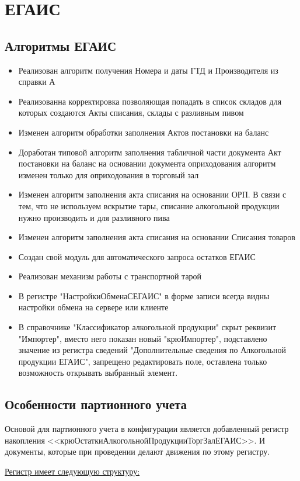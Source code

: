 \section{ЕГАИС}
\subsection{Алгоритмы ЕГАИС}


\begin{itemize}
	\item Реализован алгоритм получения Номера и даты ГТД и Производителя из справки А
	\item Реализованна корректировка позволяющая попадать в список складов для которых создаются Акты списания, склады с разливным пивом
	\item Изменен алгоритм обработки заполнения Актов постановки на баланс
	\item Доработан типовой алгоритм заполнения табличной части документа Акт постановки на баланс на 	основании документа оприходования алгоритм изменен только для оприходования в торговый зал
	\item Изменен алгоритм заполнения акта списания на основании ОРП. В связи с тем, что не используем вскрытие тары, списание алкогольной продукции  нужно производить и для разливного пива

	\item Изменен алгоритм заполнения акта списания на основании Списания товаров
	\item Создан свой модуль для автоматического запроса остатков ЕГАИС
	\item Реализован механизм работы с транспортной тарой
	\item В регистре "НастройкиОбменаСЕГАИС" в форме записи всегда видны настройки обмена на сервере или клиенте
	\item В справочнике "Классификатор алкогольной продукции" скрыт реквизит "Импортер", вместо него показан новый "крюИмпортер", подставлено значение из регистра сведений "Дополнительные сведения по Алкогольной продукции ЕГАИС", запрещено редактировать поле, оставлена только возможность открывать выбранный элемент.

\end{itemize}
\newpage
\subsection{Особенности партионного учета}

Основой для партионного учета в конфигурации является добавленный регистр накопления <<крюОстаткиАлкогольнойПродукцииТоргЗалЕГАИС>>. И документы, которые при проведении делают движения по этому регистру. \par
\noindent \underline{Регистр имеет следующую структуру:}

